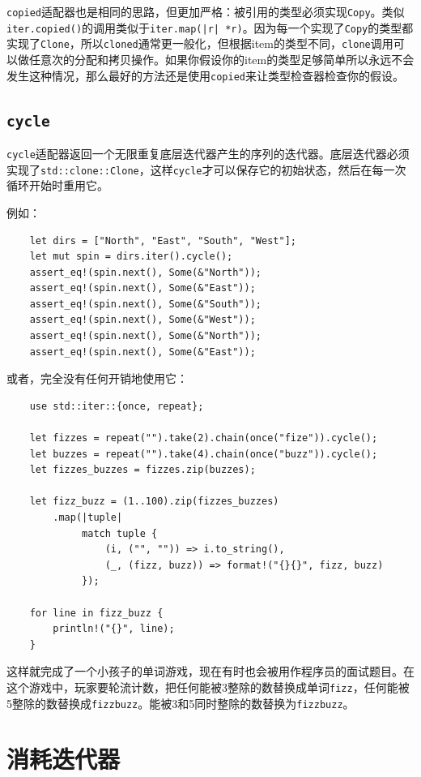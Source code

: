 \texttt{copied}适配器也是相同的思路，但更加严格：被引用的类型必须实现\texttt{Copy}。类似\texttt{iter.copied()}的调用类似于\texttt{iter.map(|r| *r)}。因为每一个实现了\texttt{Copy}的类型都实现了\texttt{Clone}，所以\texttt{cloned}通常更一般化，但根据item的类型不同，\texttt{clone}调用可以做任意次的分配和拷贝操作。如果你假设你的item的类型足够简单所以永远不会发生这种情况，那么最好的方法还是使用\texttt{copied}来让类型检查器检查你的假设。

\subsection{\texttt{cycle}}
\texttt{cycle}适配器返回一个无限重复底层迭代器产生的序列的迭代器。底层迭代器必须实现了\texttt{std::clone::Clone}，这样\texttt{cycle}才可以保存它的初始状态，然后在每一次循环开始时重用它。

例如：
\begin{verbatim}
    let dirs = ["North", "East", "South", "West"];
    let mut spin = dirs.iter().cycle();
    assert_eq!(spin.next(), Some(&"North"));
    assert_eq!(spin.next(), Some(&"East"));
    assert_eq!(spin.next(), Some(&"South"));
    assert_eq!(spin.next(), Some(&"West"));
    assert_eq!(spin.next(), Some(&"North"));
    assert_eq!(spin.next(), Some(&"East"));
\end{verbatim}

或者，完全没有任何开销地使用它：
\begin{verbatim}
    use std::iter::{once, repeat};

    let fizzes = repeat("").take(2).chain(once("fize")).cycle();
    let buzzes = repeat("").take(4).chain(once("buzz")).cycle();
    let fizzes_buzzes = fizzes.zip(buzzes);

    let fizz_buzz = (1..100).zip(fizzes_buzzes)
        .map(|tuple|
             match tuple {
                 (i, ("", "")) => i.to_string(),
                 (_, (fizz, buzz)) => format!("{}{}", fizz, buzz)
             });
    
    for line in fizz_buzz {
        println!("{}", line);
    }
\end{verbatim}

这样就完成了一个小孩子的单词游戏，现在有时也会被用作程序员的面试题目。在这个游戏中，玩家要轮流计数，把任何能被3整除的数替换成单词\texttt{fizz}，任何能被5整除的数替换成\texttt{fizzbuzz}。能被3和5同时整除的数替换为\texttt{fizzbuzz}。

\section{消耗迭代器}

